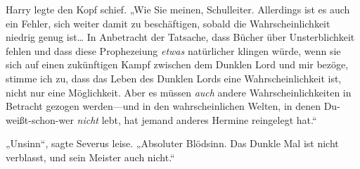 Harry legte den Kopf schief. „Wie Sie meinen, Schulleiter. Allerdings ist es auch ein Fehler, sich weiter damit zu beschäftigen, sobald die Wahrscheinlichkeit niedrig genug ist… In Anbetracht der Tatsache, dass Bücher über Unsterblichkeit fehlen und dass diese Prophezeiung \emph{etwas} natürlicher klingen würde, wenn sie sich auf einen zukünftigen Kampf zwischen dem Dunklen Lord und mir bezöge, stimme ich zu, dass das Leben des Dunklen Lords eine Wahrscheinlichkeit ist, nicht nur eine Möglichkeit. Aber es müssen \emph{auch} andere Wahrscheinlichkeiten in Betracht gezogen werden—und in den wahrscheinlichen Welten, in denen Du-weißt-schon-wer \emph{nicht} lebt, hat jemand anderes Hermine reingelegt hat.“

„Unsinn“, sagte Severus leise. „Absoluter Blödsinn. Das Dunkle Mal ist nicht verblasst, und sein Meister auch nicht.“

